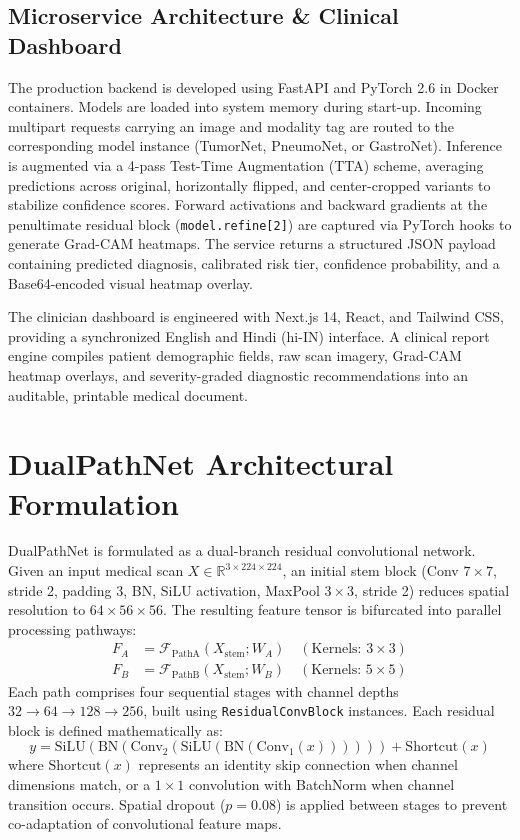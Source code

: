 \documentclass[conference]{IEEEtran}
\begin{document}
\subsection{Microservice Architecture \& Clinical Dashboard}
The production backend is developed using FastAPI and PyTorch 2.6 in Docker containers. Models are loaded into system memory during start-up. Incoming multipart requests carrying an image and modality tag are routed to the corresponding model instance (TumorNet, PneumoNet, or GastroNet). Inference is augmented via a 4-pass Test-Time Augmentation (TTA) scheme, averaging predictions across original, horizontally flipped, and center-cropped variants to stabilize confidence scores. Forward activations and backward gradients at the penultimate residual block (\texttt{model.refine[2]}) are captured via PyTorch hooks to generate Grad-CAM heatmaps. The service returns a structured JSON payload containing predicted diagnosis, calibrated risk tier, confidence probability, and a Base64-encoded visual heatmap overlay.

The clinician dashboard is engineered with Next.js 14, React, and Tailwind CSS, providing a synchronized English and Hindi (hi-IN) interface. A clinical report engine compiles patient demographic fields, raw scan imagery, Grad-CAM heatmap overlays, and severity-graded diagnostic recommendations into an auditable, printable medical document.

\section{DualPathNet Architectural Formulation}
DualPathNet is formulated as a dual-branch residual convolutional network. Given an input medical scan $X \in \mathbb{R}^{3\times 224\times 224}$, an initial stem block (Conv $7\times 7$, stride 2, padding 3, BN, SiLU activation, MaxPool $3\times 3$, stride 2) reduces spatial resolution to $64\times 56\times 56$. The resulting feature tensor is bifurcated into parallel processing pathways:
\begin{align}
    F_A &= \mathcal{F}_{\text{PathA}}(X_{\text{stem}}; W_A) \quad (\text{Kernels: } 3\times 3) \\
    F_B &= \mathcal{F}_{\text{PathB}}(X_{\text{stem}}; W_B) \quad (\text{Kernels: } 5\times 5)
\end{align}
Each path comprises four sequential stages with channel depths $32\to 64\to 128\to 256$, built using \texttt{ResidualConvBlock} instances. Each residual block is defined mathematically as:
\begin{equation}
    y = \text{SiLU}\left(\text{BN}\left(\text{Conv}_2\left(\text{SiLU}\left(\text{BN}\left(\text{Conv}_1(x)\right)\right)\right)\right)\right) + \text{Shortcut}(x)
\end{equation}
where $\text{Shortcut}(x)$ represents an identity skip connection when channel dimensions match, or a $1\times 1$ convolution with BatchNorm when channel transition occurs. Spatial dropout ($p=0.08$) is applied between stages to prevent co-adaptation of convolutional feature maps.
\end{document}
